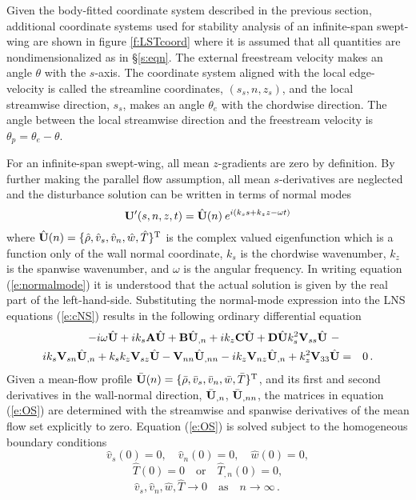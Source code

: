 Given the body-fitted coordinate system described in the previous section,
additional coordinate systems used for stability analysis of an infinite-span
swept-wing are shown in figure \ref{f:LSTcoord} where it is assumed that all
quantities are nondimensionalized as in \S\ref{s:eqn}.  The external
freestream velocity makes an angle $\theta$ with the $s$-axis.  The coordinate
system aligned with the local edge-velocity is called the streamline
coordinates, $(s_s,n,z_s)$, and the local streamwise direction, $s_s$, makes
an angle $\theta_e$ with the chordwise direction.  The angle between the local
streamwise direction and the freestream velocity is $\theta_p = \theta_e -
\theta$.

For an infinite-span swept-wing, all mean $z$-gradients are zero by
definition.  By further making the parallel flow assumption, all mean
$s$-derivatives are neglected and the disturbance solution can be written in
terms of normal modes
%
\begin{equation} \label{e:normalmode}
   {\bf U}'(s,n,z,t) = {\hat{\bf U}}(n) \: e^{i( k_s s + k_z z - \omega t)}
\end{equation}
%
where ${\hat{\bf U}}(n) = \{ \hat\rho, \hat v_s, \hat v_n, \hat w, \hat T\}^{\rm T}$ is
the complex valued eigenfunction which is a function only of the wall normal
coordinate, $k_s$ is the chordwise wavenumber, $k_z$ is the spanwise
wavenumber, and $\omega$ is the angular frequency.  In writing equation
(\ref{e:normalmode}) it is understood that the actual solution is given by the
real part of the left-hand-side.  Substituting the normal-mode expression into
the LNS equations (\ref{e:cNS}) results in the following ordinary differential
equation
%
\begin{eqnarray} \label{e:OS}
  -i \omega {\hat{\bf U}} + i k_s {\bf A} {\hat{\bf U}} + {\bf B} {\hat{\bf U}}_{,n} + i k_z {\bf C} {\hat{\bf U}} + {\bf D} {\hat{\bf U}}
  k_s^2 {{\bf V}_{ss}} {\hat{\bf U}} \ - & &\cr i k_s {{\bf V}_{sn}} {\hat{\bf U}}_{,n} +
  k_s k_z {{\bf V}_{sz}} {\hat{\bf U}} - {{\bf V}_{nn}} {\hat{\bf U}}_{,nn} -
  i k_z {{\bf V}_{nz}} {\hat{\bf U}}_{,n} + k_z^2 {{\bf V}_{33}} {\hat{\bf U}}  &=& 0 {\, .}
\end{eqnarray}
%
Given a mean-flow profile $\bar{{\bf U}}(n) = \{\bar\rho,\bar v_s,\bar v_n,\bar
w,\bar T\}^{\rm T}$, and its first and second derivatives in the wall-normal
direction, $\bar{{\bf U}}_{,n}$, $\bar{{\bf U}}_{,nn}$, the matrices in equation
(\ref{e:OS}) are determined with the streamwise and spanwise derivatives of
the mean flow set explicitly to zero.  Equation (\ref{e:OS}) is solved subject
to the homogeneous boundary conditions
%
\begin{equation}  \label{e:LST-BC-u-wall}
  \hat v_s(0) = 0 \comma \quad \hat v_n(0) = 0 \comma \quad 
  \hat w(0) = 0 \comma
\end{equation}
\begin{equation} \label{e:LST-BC-t-wall}
  \hat T(0) = 0 \quad \mbox{or} \quad \hat T_{,n}(0) = 0 \comma
\end{equation} 
\begin{equation} \label{e:LST-BC-infty}
  \hat v_s, \hat v_n, \hat w, \hat T \rightarrow 0 \quad \mbox{as} 
  \quad n \rightarrow \infty \period
\end{equation}

